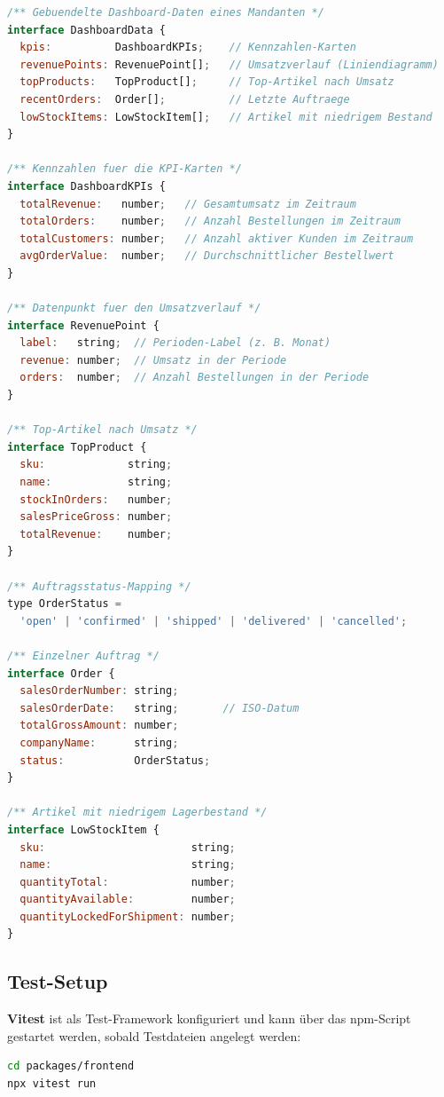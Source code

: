\documentclass[11pt, a4paper, oneside]{report}
\begin{document}
\begin{lstlisting}[language=JavaScript, caption={TypeScript-Interfaces (api.ts)}]
/** Gebuendelte Dashboard-Daten eines Mandanten */
interface DashboardData {
  kpis:          DashboardKPIs;    // Kennzahlen-Karten
  revenuePoints: RevenuePoint[];   // Umsatzverlauf (Liniendiagramm)
  topProducts:   TopProduct[];     // Top-Artikel nach Umsatz
  recentOrders:  Order[];          // Letzte Auftraege
  lowStockItems: LowStockItem[];   // Artikel mit niedrigem Bestand
}

/** Kennzahlen fuer die KPI-Karten */
interface DashboardKPIs {
  totalRevenue:   number;   // Gesamtumsatz im Zeitraum
  totalOrders:    number;   // Anzahl Bestellungen im Zeitraum
  totalCustomers: number;   // Anzahl aktiver Kunden im Zeitraum
  avgOrderValue:  number;   // Durchschnittlicher Bestellwert
}

/** Datenpunkt fuer den Umsatzverlauf */
interface RevenuePoint {
  label:   string;  // Perioden-Label (z. B. Monat)
  revenue: number;  // Umsatz in der Periode
  orders:  number;  // Anzahl Bestellungen in der Periode
}

/** Top-Artikel nach Umsatz */
interface TopProduct {
  sku:             string;
  name:            string;
  stockInOrders:   number;
  salesPriceGross: number;
  totalRevenue:    number;
}

/** Auftragsstatus-Mapping */
type OrderStatus =
  'open' | 'confirmed' | 'shipped' | 'delivered' | 'cancelled';

/** Einzelner Auftrag */
interface Order {
  salesOrderNumber: string;
  salesOrderDate:   string;       // ISO-Datum
  totalGrossAmount: number;
  companyName:      string;
  status:           OrderStatus;
}

/** Artikel mit niedrigem Lagerbestand */
interface LowStockItem {
  sku:                       string;
  name:                      string;
  quantityTotal:             number;
  quantityAvailable:         number;
  quantityLockedForShipment: number;
}
\end{lstlisting}

\subsection*{Test-Setup}

\textbf{Vitest} ist als Test-Framework konfiguriert und kann über das npm-Script
gestartet werden, sobald Testdateien angelegt werden:

\begin{lstlisting}[language=bash, caption={Test-Script starten (packages/frontend)}]
cd packages/frontend
npx vitest run
\end{lstlisting}
\end{document}
